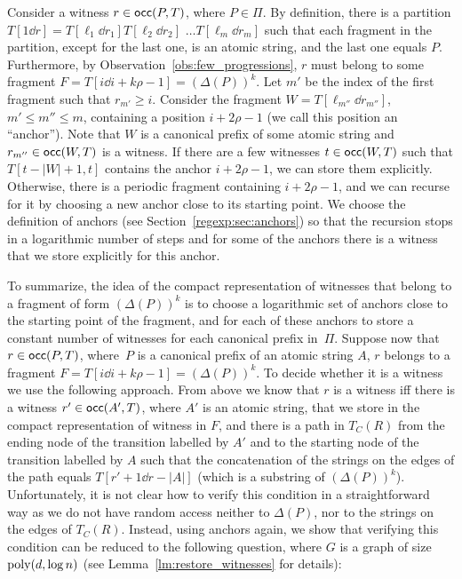 Consider a witness $r \in \mathsf{occ}(P, T)$, where $P \in \Pi$. By definition, there is a partition $T[1\dd r] = T[\ell_1\dd r_1] T[\ell_2 \dd r_2]$ $\ldots T[\ell_m \dd r_m]$ such that each fragment in the partition, except for the last one, is an atomic string, and the last one equals $P$. Furthermore, by Observation~\ref{obs:few_progressions}, $r$ must belong to some fragment $F = T[i \dd i + k \rho -1] = (\Delta(P))^k$. Let $m'$ be the index of the first fragment such that $r_{m'} \ge i$. Consider the fragment $W = T[\ell_{m''} \dd r_{m''}]$, $m' \le m'' \le m$, containing a position $i+2\rho-1$ (we call this position an ``anchor''). Note that $W$  is a canonical prefix of some atomic string and $r_{m''} \in \mathsf{occ}(W, T)$ is a witness. If there are a few witnesses $t \in \mathsf{occ}(W, T)$ such that $T[t-|W|+1,t]$ contains the anchor $i+2\rho-1$, we can store them explicitly. Otherwise, there is a periodic fragment containing $i+2\rho-1$, and we can recurse for it by choosing a new anchor close to its starting point. We choose the definition of anchors (see Section~\ref{regexp:sec:anchors}) so that the recursion stops in a logarithmic number of steps and for some of the anchors there is a witness that we store explicitly for this anchor. 

To summarize, the idea of the compact representation of witnesses that belong to a fragment of form $(\Delta(P))^k$ is to choose a logarithmic set of anchors close to the starting point of the fragment, and for each of these anchors to store a constant number of witnesses for each canonical prefix in~$\Pi$.  Suppose now that $r \in \mathsf{occ}(P,T)$, where~$P$ is a canonical prefix of an atomic string $A$, $r$ belongs to a fragment $F = T[i \dd i + k \rho -1] = (\Delta(P))^k$. To decide whether it is a witness we use the following approach. From above we know that $r$ is a witness iff there is a witness $r' \in \mathsf{occ}(A',T)$, where $A'$ is an atomic string, that we store in the compact representation of witness in $F$, and there is a path in $T_C(R)$ from the ending node of the transition labelled by $A'$ and to the starting node of the transition labelled by $A$ such that the concatenation of the strings on the edges of the path equals $T[r'+1\dd r-|A|]$ (which is a substring of $(\Delta(P))^k$). Unfortunately, it is not clear how to verify this condition in a straightforward way as we do not have random access neither to $\Delta(P)$, nor to the strings on the edges of $T_C(R)$. Instead, using anchors again, we show that verifying this condition can be reduced to the following question, where $G$ is a graph of size $\mathrm{poly}(d, \log n)$ (see Lemma~\ref{lm:restore_witnesses} for details):

